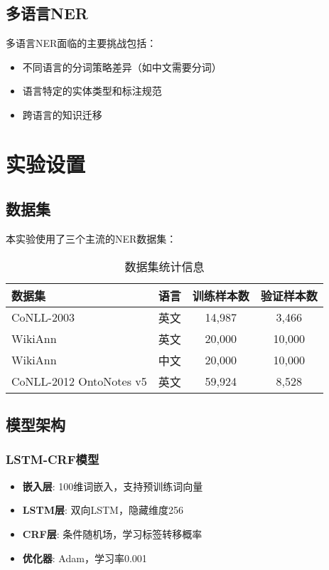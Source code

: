 \documentclass[12pt,a4paper]{article}
\begin{document}
\subsection{多语言NER}
多语言NER面临的主要挑战包括：
\begin{itemize}
    \item 不同语言的分词策略差异（如中文需要分词）
    \item 语言特定的实体类型和标注规范
    \item 跨语言的知识迁移
\end{itemize}

\section{实验设置}

\subsection{数据集}

本实验使用了三个主流的NER数据集：

\begin{table}[H]
\centering
\caption{数据集统计信息}
\begin{tabular}{lccc}
\toprule
数据集 & 语言 & 训练样本数 & 验证样本数 \\
\midrule
CoNLL-2003 & 英文 & 14,987 & 3,466 \\
WikiAnn & 英文 & 20,000 & 10,000 \\
WikiAnn & 中文 & 20,000 & 10,000 \\
CoNLL-2012 OntoNotes v5 & 英文 & 59,924 & 8,528 \\
\bottomrule
\end{tabular}
\end{table}

\subsection{模型架构}

\subsubsection{LSTM-CRF模型}
\begin{itemize}
    \item \textbf{嵌入层}: 100维词嵌入，支持预训练词向量
    \item \textbf{LSTM层}: 双向LSTM，隐藏维度256
    \item \textbf{CRF层}: 条件随机场，学习标签转移概率
    \item \textbf{优化器}: Adam，学习率0.001
\end{itemize}
\end{document}
